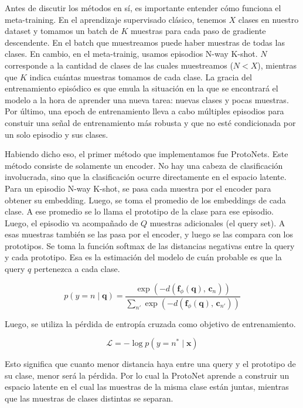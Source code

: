 \documentclass[12pt]{article}
\begin{document}
Antes de discutir los métodos en sí, es importante entender cómo funciona el meta-training. En el aprendizaje supervisado clásico, tenemos $X$ clases en nuestro dataset y tomamos un batch de $K$ muestras para cada paso de gradiente descendente. En el batch que muestreamos puede haber muestras de todas las clases. En cambio, en el meta-trainig, usamos episodios N-way K-shot. $N$ corresponde a la cantidad de clases de las cuales muestreamos ($N < X$), mientras que $K$ indica cuántas muestras tomamos de cada clase. La gracia del entrenamiento episódico es que emula la situación en la que se encontrará el modelo a la hora de aprender una nueva tarea: nuevas clases y pocas muestras. Por último, una epoch de entrenamiento lleva a cabo múltiples episodios para constuir una señal de entrenamiento más robusta y que no esté condicionada por un solo episodio y sus clases.

Habiendo dicho eso, el primer método que implementamos fue ProtoNets. Este método consiste de solamente un encoder. No hay una cabeza de clasificación involucrada, sino que la clasificación ocurre directamente en el espacio latente. Para un episodio N-way K-shot, se pasa cada muestra por el encoder para obtener su embedding. Luego, se toma el promedio de los embeddings de cada clase. A ese promedio se lo llama el prototipo de la clase para ese episodio. Luego, el episodio va acompañado de $Q$ muestras adicionales (el query set). A esas muestras también se las pasa por el encoder, y luego se las compara con los prototipos. Se toma la función softmax de las distancias negativas entre la query y cada prototipo. Esa es la estimación del modelo de cuán probable es que la query $q$ pertenezca a cada clase.

\begin{equation}
    p(y = n \mid \mathbf{q}) = \frac{\exp(-d(\mathbf{f}_\phi(\mathbf{q}),\, \mathbf{c}_n))}{\sum_{n'} \exp(-d(\mathbf{f}_\phi(\mathbf{q}),\, \mathbf{c}_{n'}))}
\end{equation}

Luego, se utiliza la pérdida de entropía cruzada como objetivo de entrenamiento. 


\begin{equation}
\mathcal{L} = -\log p(y = n^* \mid \mathbf{x})
\end{equation}

Esto significa que cuanto menor distancia haya entre una query y el prototipo de su clase, menor será la pérdida. Por lo cual la ProtoNet aprende a construir un espacio latente en el cual las muestras de la misma clase están juntas, mientras que las muestras de clases distintas se separan.
\end{document}
